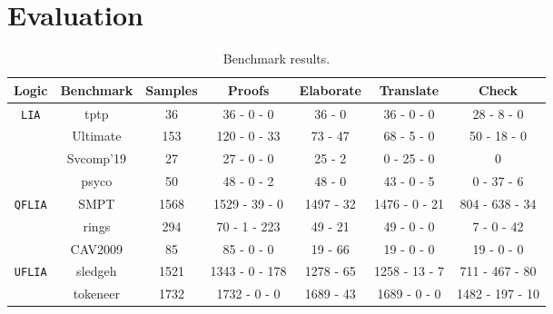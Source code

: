 \section{Evaluation}
\label{sec:evaluation}

\begin{table}[bt]
\centering
\caption{Benchmark results.}
\begin{tabular}{|c|c|c|c|c|c|c|}
\hline                                                             %
\textbf{Logic}                & \textbf{Benchmark}  & \textbf{Samples} & \textbf{Proofs}       & \textbf{Elaborate} & \textbf{Translate} & \textbf{Check} \\ \hline
\multirow{4}{*}{\tt{LIA}}     & tptp            & 36               &  36 - 0 - 0           &  36 - 0             & 36 - 0 - 0          & 28 - 8 - 0       \\ \cline{2-7} 
                              & Ultimate        & 153              &  120 - 0 - 33         &  73 - 47            & 68 - 5 - 0          & 50 - 18 - 0      \\ \cline{2-7} 
                              & Svcomp'19      & 27               &  27 - 0 - 0           &  25 - 2             & 0 - 25 - 0          & 0                \\ \cline{2-7} 
                              & psyco           & 50               &  48 - 0 - 2           &  48 - 0             & 43 - 0 - 5          & 0 - 37 - 6       \\ \hline
\multirow{2}{*}{\tt{QFLIA}}   & SMPT            & 1568             &  1529 - 39 - 0        &  1497 - 32          & 1476 - 0 - 21       & 804 - 638 - 34   \\ \cline{2-7}
                              & rings           & 294              &  70 - 1 - 223         &  49 - 21            & 49 - 0 - 0          & 7 - 0 - 42       \\ \cline{2-7} 
                              & CAV2009       & 85               &  85 - 0 - 0           &  19 - 66             & 19 - 0 - 0          & 19 - 0 - 0       \\ \hline
\multirow{2}{*}{\tt{UFLIA}}   & sledgeh    & 1521             &  1343 - 0 - 178       &  1278 - 65         & 1258 - 13 - 7       & 711 - 467 - 80   \\ \cline{2-7} 
                              & tokeneer        & 1732             &  1732 - 0 - 0         & 1689 - 43           & 1689 - 0 - 0        & 1482 - 197 - 10  \\ \hline
\end{tabular}
\label{table:benchmarks-description}
\end{table}

